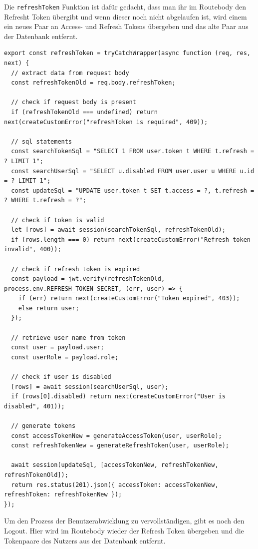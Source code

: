 \documentclass[
    headings=optiontotocandhead,%
    twoside,
    numbers=noenddot,%
    12pt, %
    titlepage, %
    parskip=full, %
    listof=leveldown, 
    numbers=noenddot, %
    a4paper,DIV=14,
    BCOR=15mm,
]{scrbook}
\newcommand{\passthrough}[1]{#1}
\begin{document}
Die \passthrough{\lstinline!refreshToken!} Funktion ist dafür gedacht,
dass man ihr im Routebody den Refresht Token übergibt und wenn dieser
noch nicht abgelaufen ist, wird einem ein neues Paar an Access- und
Refresh Tokens übergeben und das alte Paar aus der Datenbank entfernt.

\begin{lstlisting}[caption={Refresh Token Funktion}]
export const refreshToken = tryCatchWrapper(async function (req, res, next) {
  // extract data from request body
  const refreshTokenOld = req.body.refreshToken;

  // check if request body is present
  if (refreshTokenOld === undefined) return next(createCustomError("refreshToken is required", 409));

  // sql statements
  const searchTokenSql = "SELECT 1 FROM user.token t WHERE t.refresh = ? LIMIT 1";
  const searchUserSql = "SELECT u.disabled FROM user.user u WHERE u.id = ? LIMIT 1";
  const updateSql = "UPDATE user.token t SET t.access = ?, t.refresh = ? WHERE t.refresh = ?";

  // check if token is valid
  let [rows] = await session(searchTokenSql, refreshTokenOld);
  if (rows.length === 0) return next(createCustomError("Refresh token invalid", 400));

  // check if refresh token is expired
  const payload = jwt.verify(refreshTokenOld, process.env.REFRESH_TOKEN_SECRET, (err, user) => {
    if (err) return next(createCustomError("Token expired", 403));
    else return user;
  });

  // retrieve user name from token
  const user = payload.user;
  const userRole = payload.role;

  // check if user is disabled
  [rows] = await session(searchUserSql, user);
  if (rows[0].disabled) return next(createCustomError("User is disabled", 401));

  // generate tokens
  const accessTokenNew = generateAccessToken(user, userRole);
  const refreshTokenNew = generateRefreshToken(user, userRole);

  await session(updateSql, [accessTokenNew, refreshTokenNew, refreshTokenOld]);
  return res.status(201).json({ accessToken: accessTokenNew, refreshToken: refreshTokenNew });
});
\end{lstlisting}

Um den Prozess der Benutzerabwicklung zu vervollständigen, gibt es noch
den Logout. Hier wird im Routebody wieder der Refresh Token übergeben
und die Tokenpaare des Nutzers aus der Datenbank entfernt.
\end{document}
